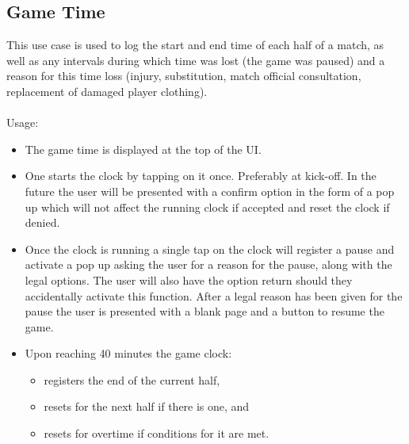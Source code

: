 \documentclass[hidelinks,a4paper,12pt]{article}
\begin{document}
	\subsection{Game Time}
	This use case is used to log the start and end time of each half of a match, as well as any intervals during which time was lost (the game was paused) and a reason for this time loss (injury, substitution, match official consultation, replacement of damaged player clothing). 
	\\ \\
	Usage:
	\begin{itemize}
		\item The game time is displayed at the top of the UI.
		\item One starts the clock by tapping on it once. Preferably at kick-off. In the future the user will be presented with a confirm option in the form of a pop up which will not affect the running clock if accepted and reset the clock if denied.
		\item Once the clock is running a single tap on the clock will register a pause and activate a pop up asking the user for a reason for the pause, along with the legal options. The user will also have the option return should they accidentally activate this function. After a legal reason has been given for the pause the user is presented with a blank page and a button to resume the game.
		\item Upon reaching 40 minutes the game clock:
		\begin{itemize}
		\item registers the end of the current half,
		\item resets for the next half if there is one, and
		\item resets for overtime if conditions for it are met.
		\end{itemize}
	\end{itemize}
\end{document}
